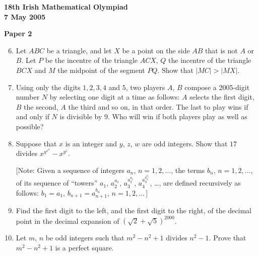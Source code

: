 \documentclass[12pt]{article}
\begin{document}
\newpage
\begin{center}
{\large\bfseries 18th Irish Mathematical Olympiad\\7 May 2005}
\end{center}
\bigskip\noindent\textbf{Paper 2}\bigskip
\begin{enumerate}
\setcounter{enumi}{5}
\item Let $ABC$ be a triangle, and let $X$ be a point on the side $AB$ that is not $A$ or $B$. Let $P$ be the incentre of the triangle $ACX$, $Q$ the incentre of the triangle $BCX$ and $M$ the midpoint of the segment $PQ$. Show that $|MC| > |MX|$.

\item Using only the digits $1, 2, 3, 4$ and $5$, two players $A$, $B$ compose a 2005-digit number $N$ by selecting one digit at a time as follows: $A$ selects the first digit, $B$ the second, $A$ the third and so on, in that order. The last to play wins if and only if $N$ is divisible by $9$. Who will win if both players play as well as possible?

\item Suppose that $x$ is an integer and $y$, $z$, $w$ are odd integers. Show that $17$ divides $x^{y^{z^w}} - x^{y^z}$.

[Note: Given a sequence of integers $a_n$, $n = 1, 2, \ldots$, the terms $b_n$, $n = 1, 2, \ldots$, of its sequence of ``towers'' $a_1$, $a_2^{a_1}$, $a_3^{a_2^{a_1}}$, $a_4^{a_3^{a_2^{a_1}}}$, \ldots, are defined recursively as follows: $b_1 = a_1$, $b_{n+1} = a_{n+1}^{b_n}$, $n = 1, 2, \ldots$\,]

\item Find the first digit to the left, and the first digit to the right, of the decimal point in the decimal expansion of $(\sqrt{2} + \sqrt{5})^{2000}$.

\item Let $m$, $n$ be odd integers such that $m^2 - n^2 + 1$ divides $n^2 - 1$. Prove that $m^2 - n^2 + 1$ is a perfect square.
\end{enumerate}
\end{document}
